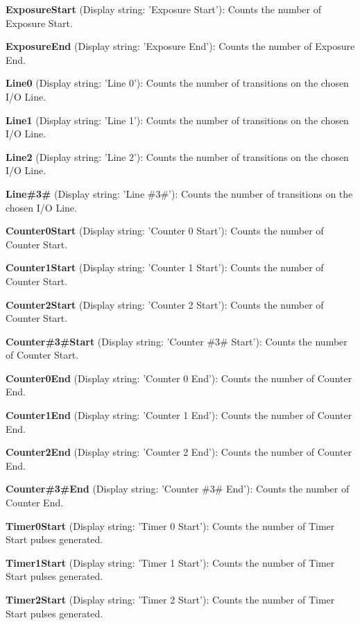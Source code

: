 \begin{DoxyItemize}
\item {\bfseries Exposure\+Start} (Display string\+: 'Exposure Start')\+: Counts the number of Exposure Start.
\item {\bfseries Exposure\+End} (Display string\+: 'Exposure End')\+: Counts the number of Exposure End.
\item {\bfseries Line0} (Display string\+: 'Line 0')\+: Counts the number of transitions on the chosen I/\+O Line.
\item {\bfseries Line1} (Display string\+: 'Line 1')\+: Counts the number of transitions on the chosen I/\+O Line.
\item {\bfseries Line2} (Display string\+: 'Line 2')\+: Counts the number of transitions on the chosen I/\+O Line.
\item {\bfseries Line\#3\#} (Display string\+: 'Line \#3\#')\+: Counts the number of transitions on the chosen I/\+O Line.
\item {\bfseries Counter0\+Start} (Display string\+: 'Counter 0 Start')\+: Counts the number of Counter Start.
\item {\bfseries Counter1\+Start} (Display string\+: 'Counter 1 Start')\+: Counts the number of Counter Start.
\item {\bfseries Counter2\+Start} (Display string\+: 'Counter 2 Start')\+: Counts the number of Counter Start.
\item {\bfseries Counter\#3\#Start} (Display string\+: 'Counter \#3\# Start')\+: Counts the number of Counter Start.
\item {\bfseries Counter0\+End} (Display string\+: 'Counter 0 End')\+: Counts the number of Counter End.
\item {\bfseries Counter1\+End} (Display string\+: 'Counter 1 End')\+: Counts the number of Counter End.
\item {\bfseries Counter2\+End} (Display string\+: 'Counter 2 End')\+: Counts the number of Counter End.
\item {\bfseries Counter\#3\#End} (Display string\+: 'Counter \#3\# End')\+: Counts the number of Counter End.
\item {\bfseries Timer0\+Start} (Display string\+: 'Timer 0 Start')\+: Counts the number of Timer Start pulses generated.
\item {\bfseries Timer1\+Start} (Display string\+: 'Timer 1 Start')\+: Counts the number of Timer Start pulses generated.
\item {\bfseries Timer2\+Start} (Display string\+: 'Timer 2 Start')\+: Counts the number of Timer Start pulses generated.

\end{DoxyItemize}
